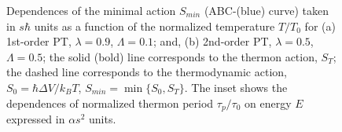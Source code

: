 \documentclass[aps, pre, preprint, groupedaddress, superscriptaddress, showkeys, showpacs] {revtex4-1}
\begin{document}
%
\begin{figure}[ht]
\begin{minipage}[h]{0.49\linewidth}
\end{minipage}
\hfill
\begin{minipage}[h]{0.49\linewidth}
\end{minipage}
\caption{Dependences of the minimal action $S_{min}$ (ABC-(blue) curve) taken in $s\hbar$ units as a function of the normalized temperature $ T/T_{0}$ for (a) 1st-order PT, $\lambda = 0.9$, $\Lambda = 0.1$; and, (b) 2nd-order PT, $\lambda = 0.5$, $\Lambda = 0.5$; the solid (bold) line corresponds to the thermon action, $S_T$; the dashed line corresponds to the thermodynamic action, $S_0 = \hbar \Delta V / k_B T$, $S_{min} = \min \{S_0, S_T\}$. The inset shows the dependences of normalized thermon period $\tau_p / \tau_0$ on energy $E$ expressed in $\alpha s^2$ units. 
\label{pic:action_period}}
\end{figure}
%
\end{document}
